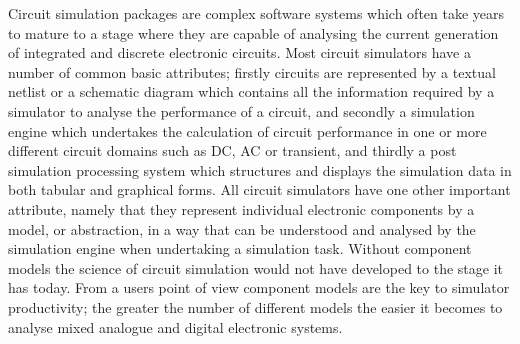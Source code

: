 Circuit simulation packages are complex software systems which often
take years to mature to a stage where they are capable of analysing
the current generation of integrated and discrete electronic
circuits. Most circuit simulators have a number of common basic
attributes; firstly circuits are represented by a textual netlist or a
schematic diagram which contains all the information required by a
simulator to analyse the performance of a circuit, and secondly a
simulation engine which undertakes the calculation of circuit
performance in one or more different circuit domains such as DC, AC or
transient, and thirdly a post simulation processing system which
structures and displays the simulation data in both tabular and
graphical forms. All circuit simulators have one other important
attribute, namely that they represent individual electronic components
by a model, or abstraction, in a way that can be understood and
analysed by the simulation engine when undertaking a simulation
task. Without component models the science of circuit simulation would
not have developed to the stage it has today. From a users point of
view component models are the key to simulator productivity; the
greater the number of different models the easier it becomes to
analyse mixed analogue and digital electronic systems.

